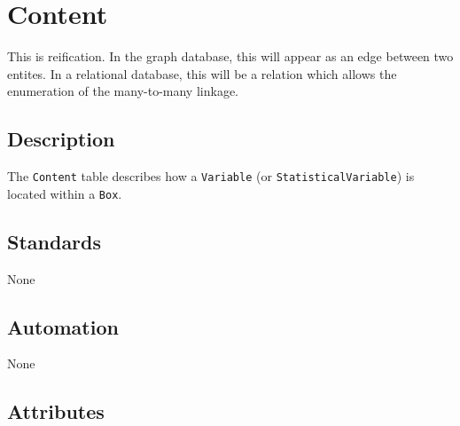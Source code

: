 \documentclass[
]{article}
\begin{document}
\section{Content}\label{content}

This is reification. In the graph database, this will appear as an edge
between two entites. In a relational database, this will be a relation
which allows the enumeration of the many-to-many linkage.

\subsection{Description}\label{description-7}

The \texttt{Content} table describes how a \texttt{Variable} (or
\texttt{StatisticalVariable}) is located within a \texttt{Box}.

\subsection{Standards}\label{standards-9}

None

\subsection{Automation}\label{automation-9}

None

\subsection{Attributes}\label{attributes-9}
\end{document}
